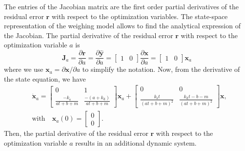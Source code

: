 The entries of the Jacobian matrix are the first order partial derivatives of the residual error $\mathbf{r}$ with respect to the optimization variables.
The state-space representation of the weighing model allows to find the analytical expression of the Jacobian.
The partial derivative of the residual error $\mathbf{r}$ with respect to the optimization variable $a$ is 
\begin{equation} \mathbf{J}_a=\dfrac{\partial \mathbf{r}}{\partial a} = \dfrac{\partial \widehat{ \mathbf{y} }}{\partial a} = \begin{bmatrix} 1 & 0  \end{bmatrix} \dfrac{\partial \mathbf{x}}{\partial a} = \begin{bmatrix} 1 & 0  \end{bmatrix} \mathbf{x}_a \end{equation}
where we use $\mathbf{x}_a = \partial \mathbf{x} / \partial a$ to simplify the notation. 
Now, from the derivative of the state equation, we have
\begin{equation} \begin{aligned} 
    & \dot{\mathbf{x}}_a = \begin{bmatrix} 0 & 1 \\ \frac{-k_{\mathrm{s}}}{a t + b + m} & \frac{-(a + k_{\mathrm{d}})}{a t + b + m} \end{bmatrix} \mathbf{x}_a 
    + \begin{bmatrix} 0 & 0 \\ \frac{k_{\mathrm{s}} t}{(a t + b + m)^2} & \frac{k_{\mathrm{d}} t - b - m}{(a t + b + m)^2} \end{bmatrix} \mathbf{x} , \\
    & \mathrm{with} \quad  \mathbf{x}_a(0) = \begin{bmatrix} 0 \\ 0 \end{bmatrix}. 
\end{aligned} \end{equation}
Then, the partial derivative of the residual error $\mathbf{r}$ with respect to the optimization variable $a$ results in an additional dynamic system.

